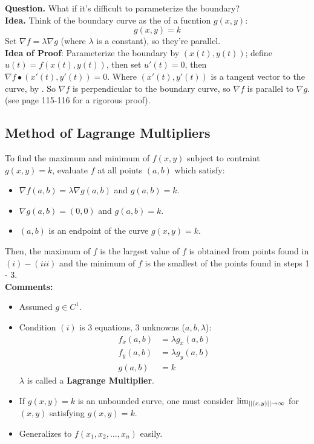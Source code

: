 \documentclass[english, 11pt]{article}
\begin{document}
\textbf{Question.} What if it's difficult to parameterize the boundary? \\

\textbf{Idea.} Think of the boundary curve as the  of a fucntion $g(x,y)$:
\[ g(x,y) = k \]
Set $\nabla f = \lambda \nabla g$ (where $\lambda$ is a constant), so they're parallel. \\

\textbf{Idea of Proof}: Parameterize the boundary by $(x(t),y(t))$; define $u(t) = f(x(t),y(t))$, then set $u'(t) = 0$, then $\nabla f \bullet (x'(t), y'(t)) = 0$. Where $(x'(t),y'(t))$ is a tangent vector to the curve, by . So $\nabla f$ is perpendicular to the boundary curve, so $\nabla f$ is parallel to $\nabla g$. (see page 115-116 for a rigorous proof).

\subsection{Method of Lagrange Multipliers}\label{lagrange}

To find the maximum and minimum of $f(x,y)$ subject to contraint $g(x,y) = k$, evaluate $f$ at all points $(a,b)$ which satisfy:
\begin{itemize}
  \item $\nabla f(a,b) = \lambda \nabla g(a,b)$ and $g(a,b) = k$.
  \item $\nabla g(a,b) = (0,0)$ and $g(a,b) = k$.
  \item $(a,b)$ is an endpoint of the curve $g(x,y) = k$.
\end{itemize}
Then, the maximum of $f$ is the largest value of $f$ is obtained from points found in $(i) - (iii)$ and the minimum of $f$ is the smallest of the points found in steps 1 - 3. \\

\textbf{Comments:} \\
\begin{itemize}
  \item Assumed $g \in C^1$.
  \item Condition $(i)$ is 3 equations, 3 unknowns ($a,b,\lambda$):
  \begin{align*}
    f_x(a,b)&  = \lambda g_x(a,b) \\
    f_y(a,b) & = \lambda g_y(a,b) \\
    g(a,b) & = k
  \end{align*}
  $\lambda$ is called a \textbf{Lagrange Multiplier}.
  \item If $g(x,y) = k$ is an unbounded curve, one must consider $\lim_{||(x,y)|| \rightarrow \infty}$ for $(x,y)$ satisfying $g(x,y) = k$.
  \item Generalizes to $f(x_1,x_2,\ldots,x_n)$ easily.
\end{itemize}
\end{document}
